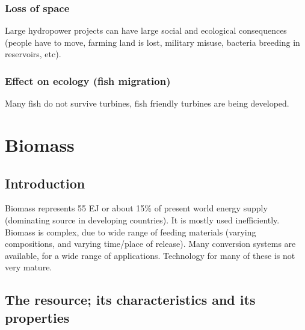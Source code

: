 \documentclass[a4paper,10pt]{article}
\begin{document}
\subsubsection{Loss of space}
Large hydropower projects can have large social and ecological consequences (people have to move, farming land is lost, military misuse, bacteria breeding in reservoirs, etc). 

\subsubsection{Effect on ecology (fish migration)}
Many fish do not survive turbines, fish friendly turbines are being developed. 


\section{Biomass}

\subsection{Introduction}
Biomass represents 55 EJ or about 15\% of present world energy supply (dominating source in developing countries). It is mostly used inefficiently. Biomass is complex, due to wide range of feeding materials (varying compositions, and varying time/place of release). Many conversion systems are available, for a wide range of applications. Technology for many of these is not very mature.

\subsection{The resource; its characteristics and its properties}
\end{document}
